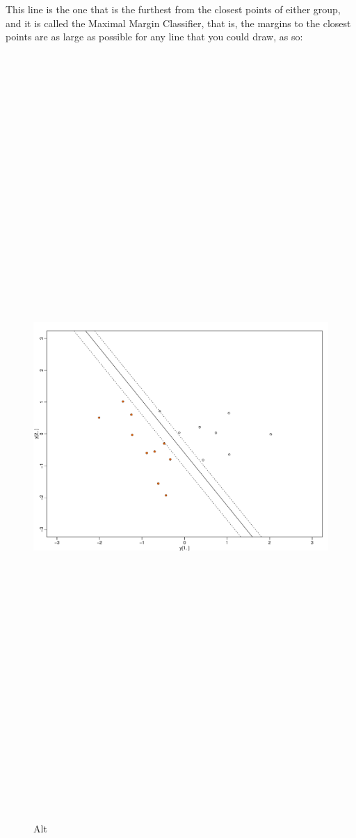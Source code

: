 \documentclass[
]{article}
\begin{document}
This line is the one that is the furthest from the closest points of
either group, and it is called the Maximal Margin Classifier, that is,
the margins to the closest points are as large as possible for any line
that you could draw, as so:

\begin{figure}
\centering
\includegraphics[width=1\textwidth,height=12.5in]{MMCdash.pdf}
\caption{Alt}
\end{figure}
\end{document}
